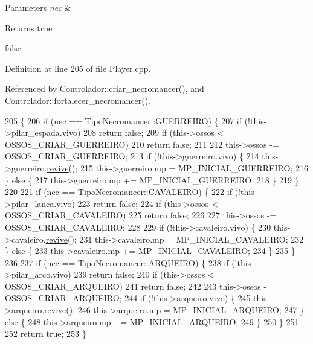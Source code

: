 \begin{DoxyParams}{Parameters}
{\em nec} & \\
\hline
\end{DoxyParams}
\begin{DoxyReturn}{Returns}
true 

false 
\end{DoxyReturn}


Definition at line 205 of file Player.\+cpp.



Referenced by Controlador\+::criar\+\_\+necromancer(), and Controlador\+::fortalecer\+\_\+necromancer().


\begin{DoxyCode}
205                                                   \{
206     \textcolor{keywordflow}{if} (nec == TipoNecromancer::GUERREIRO) \{
207         \textcolor{keywordflow}{if} (!this->pilar\_espada.vivo)
208             \textcolor{keywordflow}{return} \textcolor{keyword}{false};
209         \textcolor{keywordflow}{if} (this->ossos < OSSOS\_CRIAR\_GUERREIRO)
210             \textcolor{keywordflow}{return} \textcolor{keyword}{false};
211 
212         this->ossos -= OSSOS\_CRIAR\_GUERREIRO;
213         \textcolor{keywordflow}{if} (!this->guerreiro.vivo) \{
214             this->guerreiro.\mbox{\hyperlink{class_colocavel_em_bloco_a82f12304bcb919f4fe3fc765d00a3d0f}{revive}}();
215             this->guerreiro.mp = MP\_INICIAL\_GUERREIRO;
216         \} \textcolor{keywordflow}{else} \{
217             this->guerreiro.mp += MP\_INICIAL\_GUERREIRO;
218         \}
219     \}
220 
221     \textcolor{keywordflow}{if} (nec == TipoNecromancer::CAVALEIRO) \{
222         \textcolor{keywordflow}{if} (!this->pilar\_lanca.vivo)
223             \textcolor{keywordflow}{return} \textcolor{keyword}{false};
224         \textcolor{keywordflow}{if} (this->ossos < OSSOS\_CRIAR\_CAVALEIRO)
225             \textcolor{keywordflow}{return} \textcolor{keyword}{false};
226 
227         this->ossos -= OSSOS\_CRIAR\_CAVALEIRO;
228 
229         \textcolor{keywordflow}{if} (!this->cavaleiro.vivo) \{
230             this->cavaleiro.\mbox{\hyperlink{class_colocavel_em_bloco_a82f12304bcb919f4fe3fc765d00a3d0f}{revive}}();
231             this->cavaleiro.mp = MP\_INICIAL\_CAVALEIRO;
232         \} \textcolor{keywordflow}{else} \{
233             this->cavaleiro.mp += MP\_INICIAL\_CAVALEIRO;
234         \}
235     \}
236 
237     \textcolor{keywordflow}{if} (nec == TipoNecromancer::ARQUEIRO) \{
238         \textcolor{keywordflow}{if} (!this->pilar\_arco.vivo)
239             \textcolor{keywordflow}{return} \textcolor{keyword}{false};
240         \textcolor{keywordflow}{if} (this->ossos < OSSOS\_CRIAR\_ARQUEIRO)
241             \textcolor{keywordflow}{return} \textcolor{keyword}{false};
242 
243         this->ossos -= OSSOS\_CRIAR\_ARQUEIRO;
244         \textcolor{keywordflow}{if} (!this->arqueiro.vivo) \{
245             this->arqueiro.\mbox{\hyperlink{class_colocavel_em_bloco_a82f12304bcb919f4fe3fc765d00a3d0f}{revive}}();
246             this->arqueiro.mp = MP\_INICIAL\_ARQUEIRO;
247         \} \textcolor{keywordflow}{else} \{
248             this->arqueiro.mp += MP\_INICIAL\_ARQUEIRO;
249         \}
250     \}
251 
252     \textcolor{keywordflow}{return} \textcolor{keyword}{true};
253 \}
\end{DoxyCode}
